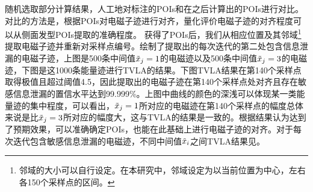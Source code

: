 {{{	%
}

	随机选取部分计算结果，人工地对标注的POIs和在\yuchuli 之后计算出的POIs进行对比。对比的方法是，根据POIs对电磁子迹进行对齐，量化评价电磁子迹的对齐程度可以从侧面发型POIs提取的准确程度。
	获得了POIs后，我们从相应位置及其邻域\footnote{邻域的大小可以自行设定。在本研究中，邻域设定为以当前位置为中心，左右各150个采样点的区间。}提取电磁子迹并重新对采样点编号。绘制了提取出的每次迭代的第二处包含信息泄漏的电磁子迹，上图是500条中间值$\tilde{x}_j=1$的电磁迹以及500条中间值$\tilde{x}_j=3$的电磁迹，下图是这1000条能量迹进行TVLA的结果。下图TVLA结果在第140个采样点取得极值且超过阈值4.5，因此提取出的电磁子迹在第140个采样点处对齐且存在敏感信息泄漏的置信水平达到99.999\%。上图中曲线的颜色的深浅可以体现某一类能量迹的集中程度，可以看出，$\tilde{x}_j=1$所对应的电磁迹在第140个采样点的幅度总体来说是比$\tilde{x}_j=3$所对应的幅度大，这与TVLA的结果是一致的。根据结果认为\yuchuli 达到了预期效果，可以准确确定POIs，也能在此基础上进行电磁子迹的对齐。对于每次迭代包含敏感信息泄漏的电磁迹，不同中间值$\tilde{x}_i$之间TVLA结果见。
	
}}
